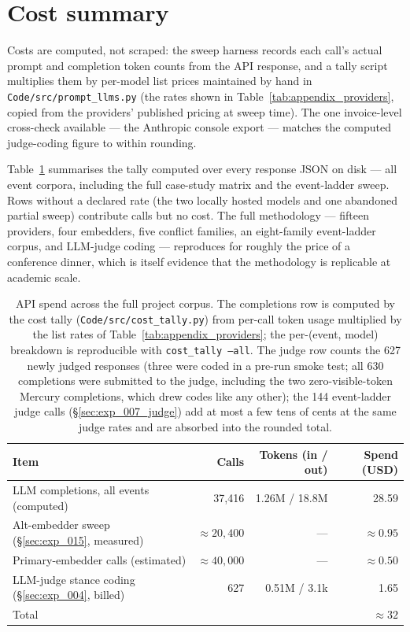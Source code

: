 \section{Cost summary}\label{sec:appendix_costs}

Costs are computed, not scraped: the sweep harness records each
call's actual prompt and completion token counts from the API
response, and a tally script multiplies them by per-model list
prices maintained by hand in \verb|Code/src/prompt_llms.py| (the
rates shown in Table~\ref{tab:appendix_providers}, copied from the
providers' published pricing at sweep time). The one
invoice-level cross-check available --- the Anthropic console
export --- matches the computed judge-coding figure to within
rounding.

Table~\ref{tab:appendix_costs} summarises the tally computed over
every response JSON on disk --- all event corpora, including the
full case-study matrix and the event-ladder sweep. Rows without a
declared rate (the two locally hosted models and one abandoned
partial sweep) contribute calls but no cost. The full methodology
--- fifteen providers, four embedders, five conflict families, an
eight-family event-ladder corpus, and LLM-judge coding ---
reproduces for roughly the price of a conference dinner, which is
itself evidence that the methodology is replicable at academic
scale.

\begin{table}[!htbp]
  \centering
  \begin{tabular}{lrrr}
    \hline
    Item & Calls & Tokens (in / out) & Spend (USD) \\
    \hline
    LLM completions, all events (computed)
      & 37{,}416 & 1.26M / 18.8M & 28.59 \\
    Alt-embedder sweep (\S\ref{sec:exp_015}, measured)
      & ${\approx}20{,}400$ & --- & $\approx 0.95$ \\
    Primary-embedder calls (estimated)
      & ${\approx}40{,}000$ & --- & $\approx 0.50$ \\
    LLM-judge stance coding (\S\ref{sec:exp_004}, billed)
      & 627 & 0.51M / 3.1k & 1.65 \\
    \hline
    Total & & & $\approx 32$ \\
    \hline
  \end{tabular}
  \caption[Cost summary]{API spend across the full project corpus.
    The completions row is computed by the cost tally
    (\texttt{Code/src/cost\_tally.py}) from per-call token usage
    multiplied by the list rates of
    Table~\ref{tab:appendix_providers}; the per-(event, model)
    breakdown is reproducible with \texttt{cost\_tally --all}. The
    judge row counts the 627 newly judged responses (three were
    coded in a pre-run smoke test; all 630 completions were
    submitted to the judge, including the two zero-visible-token
    Mercury completions, which drew codes like any other); the
    144 event-ladder judge calls (\S\ref{sec:exp_007_judge}) add at
    most a few tens of cents at the same judge rates and are
    absorbed into the rounded total.}
  \label{tab:appendix_costs}
\end{table}

